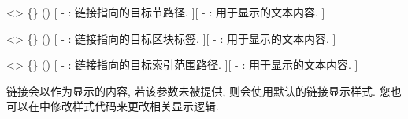 
<>{
    \{\}
    ()
}[
    -  : 链接指向的目标节路径.
][
    -  : 用于显示的文本内容.
]

<>{
    \{\}
    ()
}[
    -  : 链接指向的目标区块标签.
][
    -  : 用于显示的文本内容.
]

<>{
    \{\}
    ()
}[
    -  : 链接指向的目标索引范围路径.
][
    -  : 用于显示的文本内容.
]

链接会以作为显示的内容, 若该参数未被提供, 则\SimpleSystemTeX 会使用默认的链接显示样式. 您也可以在中修改样式代码来更改相关显示逻辑.

\newpage
